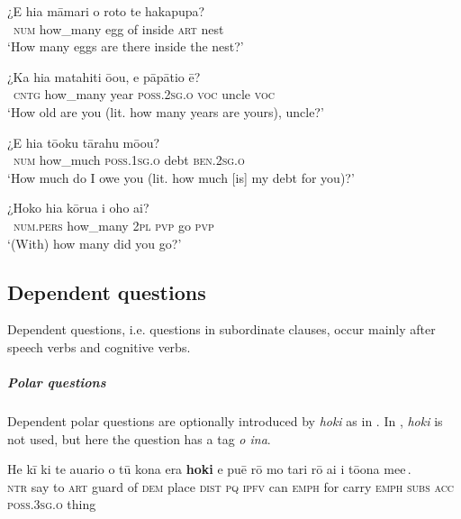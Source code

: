\ea\label{ex:10.67}
\gll ¿E hia māmari o roto te hakapupa? \\
~\textsc{num} how\_many egg of inside \textsc{art} nest \\

\glt 
‘How many eggs are there inside the nest?’ \textstyleExampleref{[R173.019]} 
\z

\ea\label{ex:10.68}
\gll ¿Ka hia matahiti ō{\ꞌ}ou, e pāpātio ē?\\
~\textsc{cntg} how\_many year \textsc{poss.2sg.o} \textsc{voc} uncle \textsc{voc}\\

\glt 
‘How old are you (lit. how many years are yours), uncle?’ \textstyleExampleref{[R416.843]} 
\z

\ea\label{ex:10.69}
\gll ¿E hia tō{\ꞌ}oku tārahu mō{\ꞌ}ou? \\
~\textsc{num} how\_much \textsc{poss.1sg.o} debt \textsc{ben.2sg.o} \\

\glt 
‘How much do I owe you (lit. how much [is] my debt for you)?’ \textstyleExampleref{[R208.200]} 
\z

\ea\label{ex:10.70}
\gll ¿Hoko hia kōrua i oho ai?\\
~\textsc{num.pers} how\_many \textsc{2pl} \textsc{pvp} go \textsc{pvp}\\

\glt 
‘(With) how many did you go?’ \textstyleExampleref{[R124.008]}\textstyleExampleref{} 
\z
{}

\subsection{Dependent questions}\label{sec:10.3.3}
Dependent questions, i.e. questions in subordinate clauses, occur mainly after speech verbs and cognitive verbs. 

\subparagraph{Polar questions} Dependent polar questions are optionally introduced by \textit{hoki} as in . In , \textit{hoki} is not used, but here the question has a tag \textit{{\ꞌ}o {\ꞌ}ina}.

\ea\label{ex:10.72}
\gll He kī ki te {\ꞌ}auario o tū kona era {\ob}\textbf{hoki} e puē rō  mo tari rō {\ꞌ}ai i tō{\ꞌ}ona me{\ꞌ}e\,{\cb}.\\
\textsc{ntr} say to \textsc{art} guard of \textsc{dem} place \textsc{dist} {\db}\textsc{pq} \textsc{ipfv} can \textsc{emph}  for carry \textsc{emph} \textsc{subs} \textsc{acc} \textsc{poss.3sg.o} thing\\

